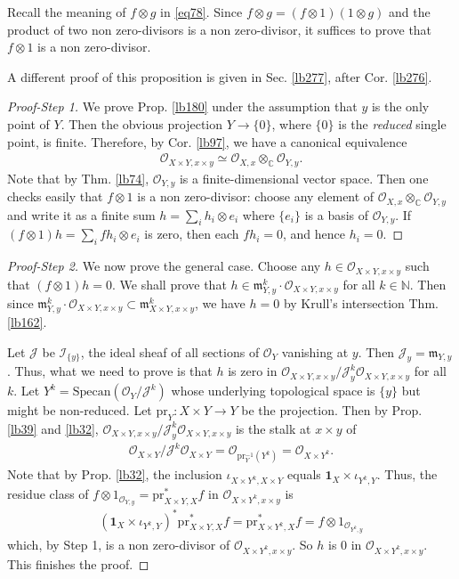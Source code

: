 \documentclass[12pt,b5paper,notitlepage]{report}
\theoremstyle{definition}
\theoremstyle{plain}
\newcommand{\fk}{\mathfrak}
\newcommand{\mc}{\mathcal}
\newcommand{\id}{\mathbf{1}}
\newcommand{\scr}{\mathscr}
\newcommand{\Cbb}{\mathbb C}
\newcommand{\Nbb}{\mathbb N}
\newcommand{\pr}{\mathrm {pr}}
\newcommand{\Specan}{\mathrm{Specan}}
\numberwithin{equation}{section}
\begin{document}
Recall the meaning of $f\otimes g$ in \eqref{eq78}. Since $f\otimes g=(f\otimes 1)(1\otimes g)$ and the product of two non zero-divisors is a non zero-divisor, it suffices to prove that $f\otimes 1$ is a non zero-divisor.

A different proof of this proposition is given in Sec. \ref{lb277}, after Cor. \ref{lb276}.

 
\begin{proof}[Proof-Step 1]
We prove Prop. \ref{lb180} under the assumption that $y$ is the only point of $Y$. Then the obvious projection $Y\rightarrow\{0\}$, where $\{0\}$ is the \textit{reduced} single point, is finite.  Therefore, by Cor. \ref{lb97}, we have a canonical equivalence
\begin{align*}
\scr O_{X\times Y,x\times y}\simeq \scr O_{X,x}\otimes_\Cbb\scr O_{Y,y}.
\end{align*}
Note that by Thm. \ref{lb74}, $\scr O_{Y,y}$ is a finite-dimensional vector space. Then one checks easily that $f\otimes 1$ is a non zero-divisor: choose any element of  $\scr O_{X,x}\otimes_\Cbb\scr O_{Y,y}$ and write it as a finite sum $h=\sum_i h_i\otimes e_i$ where $\{e_i\}$ is a basis of $\scr O_{Y,y}$. If $(f\otimes 1)h=\sum_i fh_i\otimes e_i$ is zero, then each $fh_i=0$, and hence $h_i=0$.
\end{proof}


\begin{proof}[Proof-Step 2]
We now prove the general case. Choose any $h\in\scr O_{X\times Y,x\times y}$ such that $(f\otimes 1)h=0$. We shall prove that $h\in \fk m_{Y,y}^k\cdot\scr O_{X\times Y,x\times y}$ for all $k\in\Nbb$. Then since $\fk m_{Y,y}^k\cdot\scr O_{X\times Y,x\times y}\subset\fk m_{X\times Y,x\times y}^k$, we have $h=0$ by Krull's intersection Thm. \ref{lb162}.


Let $\mc J$ be $\scr I_{\{y\}}$, the ideal sheaf of all sections of $\scr O_{Y}$ vanishing at $y$. Then $\mc J_y=\fk m_{Y,y}$. Thus, what we need to prove is that $h$ is zero in $\scr O_{X\times Y,x\times y}/\mc J_y^k\scr O_{X\times Y,x\times y}$ for all $k$. Let $Y^k=\Specan(\scr O_Y/\mc J^k)$ whose underlying topological space is $\{y\}$ but might be non-reduced. Let $\pr_Y:X\times Y\rightarrow Y$ be the projection. Then by Prop. \ref{lb39} and \ref{lb32}, $\scr O_{X\times Y,x\times y}/\mc J_y^k\scr O_{X\times Y,x\times y}$ is the stalk at $x\times y$ of
\begin{align*}
\scr O_{X\times Y}/\mc J^k\scr O_{X\times Y}=\scr O_{\pr_Y^{-1}(Y^k)}=\scr O_{X\times Y^k}.
\end{align*}
Note that by Prop. \ref{lb32}, the inclusion $\iota_{X\times Y^k,X\times Y}$ equals $\id_X\times\iota_{Y^k,Y}$. Thus, the residue class of $f\otimes 1_{\scr O_{Y,y}}=\pr_{X\times Y,X}^*f$ in $\scr O_{X\times Y^k,x\times y}$ is
\begin{align*}
(\id_X\times\iota_{Y^k,Y})^*\pr_{X\times Y,X}^*f=\pr_{X\times Y^k,X}^*f=f\otimes 1_{\scr O_{Y^k,y}}
\end{align*}
which,  by Step 1, is a non zero-divisor of $\scr O_{X\times Y^k,x\times y}$. So $h$ is $0$ in $\scr O_{X\times Y^k,x\times y}$. This finishes the proof.
\end{proof}
\end{document}
